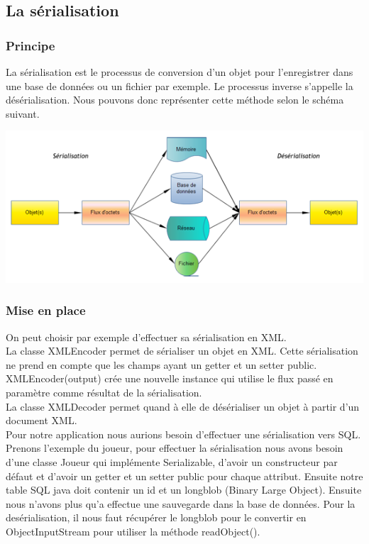 \subsection{La sérialisation}

\subsubsection{Principe}

La sérialisation est le processus de conversion d'un objet pour l'enregistrer dans une base de données ou un fichier par exemple. Le processus inverse s'appelle la désérialisation. Nous pouvons donc représenter cette méthode selon le schéma suivant. 

\begin{center}
\includegraphics[scale=0.5]{../graph/serialisation.png} \\
\end{center}

\subsubsection{Mise en place}
On peut choisir par exemple d'effectuer sa sérialisation en XML. \\

La classe XMLEncoder permet de sérialiser un objet en XML. Cette sérialisation ne prend en compte que les champs ayant un getter et un setter public. XMLEncoder(output) crée une nouvelle instance qui utilise le flux passé en paramètre comme résultat de la sérialisation. \\

La classe XMLDecoder permet quand à elle de désérialiser un objet à partir d'un document XML. \\

Pour notre application nous aurions besoin d'effectuer une sérialisation vers SQL. Prenons l'exemple du joueur, pour effectuer la sérialisation nous avons besoin d'une classe Joueur qui implémente Serializable, d'avoir un constructeur par défaut et d'avoir un getter et un setter public pour chaque attribut. Ensuite notre table SQL java doit contenir un id et un longblob (Binary Large Object). Ensuite nous n'avons plus qu'a effectue une sauvegarde dans la base de données. Pour la desérialisation, il nous faut récupérer le longblob pour le convertir en ObjectInputStream pour utiliser la méthode readObject(). 


